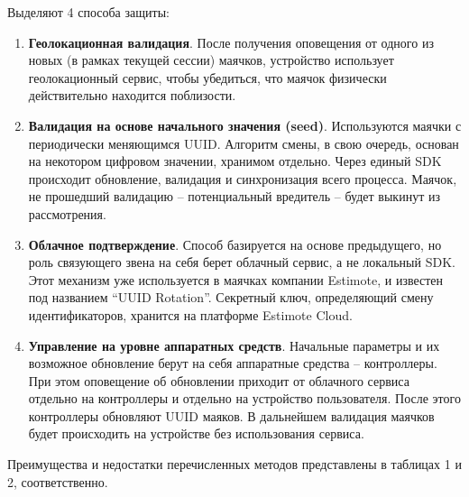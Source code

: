 Выделяют 4 способа защиты:

\begin{enumerate}
    \item
    \textbf{Геолокационная валидация}. После получения оповещения от одного из новых (в рамках текущей сессии) маячков, устройство использует геолокационный сервис, чтобы убедиться, что маячок физически действительно находится поблизости.
    \item
    \textbf{Валидация на основе начального значения (seed)}. Используются маячки с периодически меняющимся UUID. Алгоритм смены, в свою очередь, основан на некотором цифровом значении, хранимом отдельно. Через единый SDK происходит обновление, валидация и синхронизация всего процесса. Маячок, не прошедший валидацию – потенциальный вредитель – будет выкинут из рассмотрения.
    \item
    \textbf{Облачное подтверждение}. Способ базируется на основе предыдущего, но роль связующего звена на себя берет облачный сервис, а не локальный SDK. 
Этот механизм уже используется в маячках компании Estimote, и известен под названием “UUID Rotation”. Секретный ключ, определяющий смену идентификаторов, хранится на платформе Estimote Cloud.
    \item
    \textbf{Управление на уровне аппаратных средств}. Начальные параметры и их возможное обновление берут на себя аппаратные средства – контроллеры. При этом оповещение об обновлении приходит от облачного сервиса отдельно на контроллеры и отдельно на устройство пользователя. После этого контроллеры обновляют UUID маяков. В дальнейшем валидация маячков будет происходить на устройстве без использования сервиса.
\end{enumerate}

Преимущества и недостатки перечисленных методов представлены в таблицах 1 и 2, соответственно.

